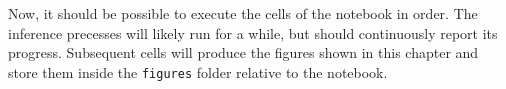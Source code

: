 \begin{tcolorbox}[
    title=\faIcon{recycle} Reproducibility,
    parbox=false,
    float
]
    Now, it should be possible to execute the cells of the notebook in order. The inference precesses will likely run for a while, but should continuously report its progress. Subsequent cells will produce the figures shown in this chapter and store them inside the  \texttt{figures} folder relative to the notebook.
\end{tcolorbox}
